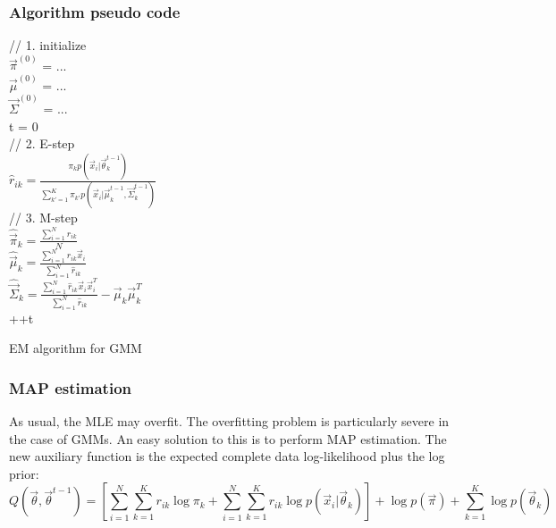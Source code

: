 \subsubsection{Algorithm pseudo code}

\begin{algorithm}[htbp]
    \SetAlgoNoLine

	// 1. initialize \\
	$\vec{\pi}^{(0)}$ = ... \\
	$\vec{\mu}^{(0)}$ = ...  \\
	$\vec{\Sigma}^{(0)}$ = ...  \\
	t = 0 \\
	 {
	    // 2. E-step \\
	    $\hat{r}_{ik}=\frac{\pi_kp(\vec{x}_i|\vec{\theta}_k^{t-1})}{\sum_{k'=1}^K \pi_{k'}p(\vec{x}_i|\vec{\mu}_k^{t-1},\vec{\Sigma}_k^{t-1})}$ \\
	    // 3. M-step \\
        $\hat{\vec{\pi}}_k=\frac{\sum_{i=1}^N \hat{r}_{ik}}{N}$ \\
		$\hat{\vec{\mu}}_k  = \frac{\sum_{i=1}^N \hat{r}_{ik}\vec{x}_i}{\sum_{i=1}^N \hat{r}_{ik}}$ \\
		$\hat{\vec{\Sigma}}_k =\frac{\sum_{i=1}^N \hat{r}_{ik}\vec{x}_i\vec{x}_i^T}{\sum_{i=1}^N \hat{r}_{ik}}-\vec{\mu}_k\vec{\mu}_k^T$ \\
        ++t \\
	}
	
\caption{EM algorithm for GMM}
\end{algorithm}


\subsubsection{MAP estimation}
As usual, the MLE may overfit. The overfitting problem is particularly severe in the case of GMMs. An easy solution to this is to perform MAP estimation. The new auxiliary function is the expected complete data log-likelihood plus the log prior:
\begin{equation}
Q(\vec{\theta}, \vec{\theta}^{t-1}) = \left[\sum\limits_{i=1}^N{\sum\limits_{k=1}^K{r_{ik}\log \pi_k}}+\sum\limits_{i=1}^N{\sum\limits_{k=1}^K{r_{ik}\log p(\vec{x}_i|\vec{\theta}_k)}}\right]+\log p(\vec{\pi})+\sum\limits_{k=1}^K{\log p(\vec{\theta}_k)}
\end{equation}

